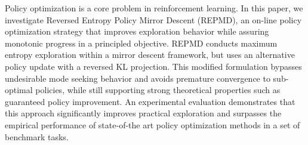 
Policy optimization is a core problem in reinforcement learning. In this paper, we investigate Reversed Entropy Policy Mirror Descent (REPMD), an on-line policy optimization strategy that improves exploration behavior while assuring monotonic progress in a principled objective. REPMD conducts maximum entropy exploration within a mirror descent framework, but uses an alternative policy update with a reversed KL projection. This modified formulation bypasses undesirable mode seeking behavior and avoids premature convergence to sub-optimal policies, while still supporting strong theoretical properties such as guaranteed policy improvement. An experimental evaluation demonstrates that this approach significantly improves practical exploration and surpasses the empirical performance of state-of-the art policy optimization methods in a set of benchmark tasks.

